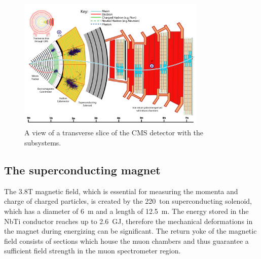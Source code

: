 \begin{figure}
\begin{centering}
\includegraphics[width=0.8\textwidth]{figures/exp/cms_slice.pdf}
\caption{A view of a transverse slice of the CMS detector with the subsystems.}
\label{fig:cms_slice}
\end{centering}
\end{figure}

\subsection{The superconducting magnet}
The 3.8T magnetic field, which is essential for measuring the momenta and charge of charged particles, is created by the 220~ton superconducting solenoid, which has a diameter of 6~m and a length of 12.5~m. The energy stored in the NbTi conductor reaches up to 2.6~GJ, therefore the mechanical deformations in the magnet during energizing can be significant. The return yoke of the magnetic field consists of sections which house the muon chambers and thus guarantee a sufficient field strength in the muon spectrometer region.

